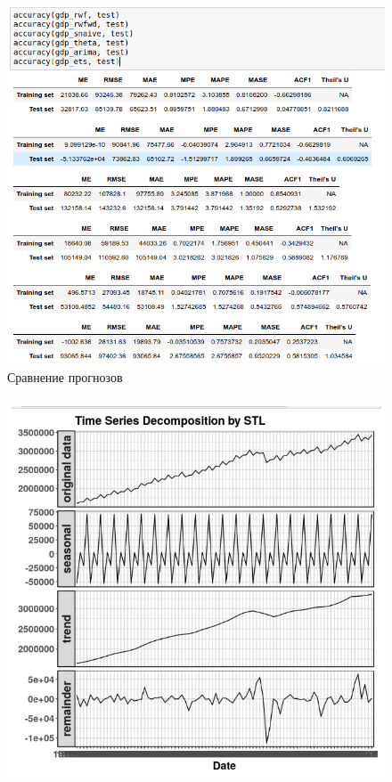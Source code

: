 \documentclass[c, dvipsnames]{beamer}  %
\begin{document}
\begin{frame}[shrink=5]
\frametitle{\insertsection} 
\framesubtitle{\insertsubsection}



\begin{figure}
	\centering
	\includegraphics[width=0.7\linewidth]{screenshot023}
	\caption{Сравнение прогнозов}
	\label{fig:screenshot021}
\end{figure}





\end{frame}



\begin{frame}[shrink=5]
\frametitle{\insertsection} 
\framesubtitle{\insertsubsection}

\begin{figure}
	\centering
	\includegraphics[width=0.7\linewidth]{screenshot024}
	\label{fig:screenshot024}
\end{figure}



\end{frame}
\end{document}
